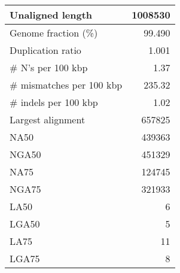 \documentclass[12pt,a4paper]{article}
\begin{document}
\begin{table}[ht]
\begin{center}
\begin{tabular}{|l*{1}{|r}|}
Unaligned length & 1008530 \\ \hline
Genome fraction (\%) & 99.490 \\ \hline
Duplication ratio & 1.001 \\ \hline
\# N's per 100 kbp & 1.37 \\ \hline
\# mismatches per 100 kbp & 235.32 \\ \hline
\# indels per 100 kbp & 1.02 \\ \hline
Largest alignment & 657825 \\ \hline
NA50 & 439363 \\ \hline
NGA50 & 451329 \\ \hline
NA75 & 124745 \\ \hline
NGA75 & 321933 \\ \hline
LA50 & 6 \\ \hline
LGA50 & 5 \\ \hline
LA75 & 11 \\ \hline
LGA75 & 8 \\ \hline
\end{tabular}
\end{center}
\end{table}
\end{document}
